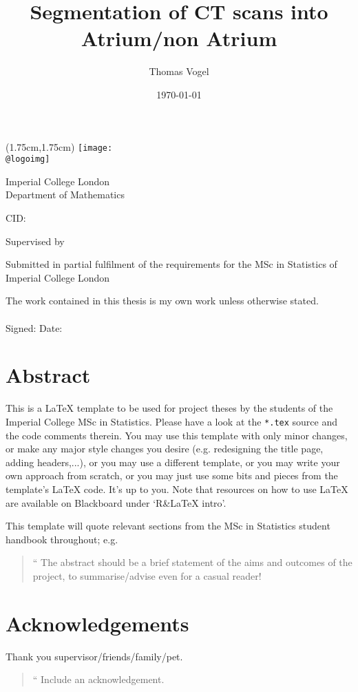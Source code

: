 \documentclass[11pt,a4,twosided,singlespacing,titlepagenumber=on]{scrreprt}
\title{Segmentation of CT scans into Atrium/non Atrium}
\author{Thomas Vogel}
\date{\today}
\makeatletter
\numberwithin{equation}{chapter} %
\renewcommand{\maketitle}{
\begin{titlepage}
\ifdefined\@logoimg
\begin{textblock*}{8cm}(1.75cm,1.75cm)
\texttt{[image: \\@logoimg]}
\end{textblock*}
\vspace*{1cm}
\else
\fi
\begin{center}
\vspace*{\stretch{0.1}}
Imperial College London\\
Department of Mathematics\par
\vspace*{\stretch{1}} %
{\titlefont\Huge \@title\par} %
\vspace*{\stretch{2}}
{\Large \@author \par}
\vspace*{1em}
{\large CID: \@CID \par}
\vspace*{\stretch{0.5}}
{\large Supervised by \@supervisor \par}
\vspace*{\stretch{3}}
{\Large \@date \par}
\vspace*{\stretch{1}}
{\large Submitted in partial fulfilment of the requirements for the
MSc in Statistics of Imperial College London}
\vspace*{\stretch{0.1}}
\end{center}%
\end{titlepage}%
}
\newcommand*{\declaration}{%
\vspace*{0.3\textheight}
The work contained in this thesis is my own work unless
otherwise stated.\\
\vspace*{0.1\textheight}\\
\hspace*{0.25\textwidth}Signed: \hspace{0.25\textwidth} Date:
\clearpage}
\renewenvironment{abstract}%
{\chapter*{Abstract}\thispagestyle{plain}}%
{\clearpage}
\newenvironment{myquote}%
{\begin{quote}{\Large{}``}}%
{\ifhmode\unskip\fi{\Large{}''}\end{quote}}
\makeatother
\begin{document}
\maketitle %

\declaration %

\begin{abstract}
This is a \LaTeX{} template to be used for project theses by the students of the Imperial College MSc in Statistics. Please have a look at the \verb|*.tex| source and the code comments therein. You may use this template with only minor changes, or make any major style changes you desire (e.g. redesigning the title page, adding headers,...), or you may use a different template, or you may write your own approach from scratch, or you may just use some bits and pieces from the template's \LaTeX{} code. It's up to you. Note that resources on how to use \LaTeX{} are available on Blackboard under `R\&{}LaTeX intro'.

This template will quote relevant sections from the MSc in Statistics student handbook throughout; e.g.
\begin{myquote}
The abstract should be a brief statement of the aims and outcomes of the project, to summarise/advise
even for a casual reader!
\end{myquote}
\end{abstract}
\newpage
\chapter*{Acknowledgements}
Thank you supervisor/friends/family/pet.
\begin{myquote}
Include an acknowledgement.
\end{myquote}
\newpage

\renewcommand{\contentsname}{Table of Contents}
\tableofcontents
\newpage






%
\end{document}
